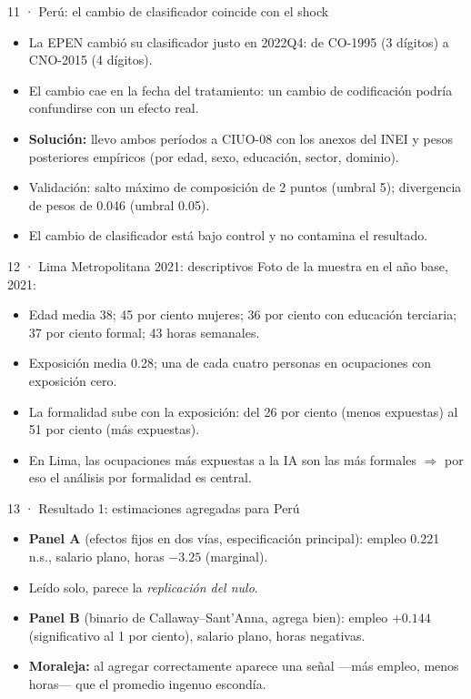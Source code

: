 \documentclass[11pt,aspectratio=169]{beamer}
\begin{document}
\begin{frame}{11 · Perú: el cambio de clasificador coincide con el shock}
\begin{itemize}
  \item La EPEN cambió su clasificador justo en 2022Q4: de CO-1995 (3 dígitos) a CNO-2015 (4 dígitos).
  \item El cambio cae en la fecha del tratamiento: un cambio de codificación podría confundirse con un efecto real.
  \item \textbf{Solución:} llevo ambos períodos a CIUO-08 con los anexos del INEI y pesos posteriores empíricos (por edad, sexo, educación, sector, dominio).
  \item Validación: salto máximo de composición de 2 puntos (umbral 5); divergencia de pesos de 0.046 (umbral 0.05).
  \item El cambio de clasificador está bajo control y no contamina el resultado.
\end{itemize}
\end{frame}

\begin{frame}{12 · Lima Metropolitana 2021: descriptivos}
Foto de la muestra en el año base, 2021:
\begin{itemize}
  \item Edad media 38; 45 por ciento mujeres; 36 por ciento con educación terciaria; 37 por ciento formal; 43 horas semanales.
  \item Exposición media 0.28; una de cada cuatro personas en ocupaciones con exposición cero.
  \item La formalidad sube con la exposición: del 26 por ciento (menos expuestas) al 51 por ciento (más expuestas).
  \item En Lima, las ocupaciones más expuestas a la IA son las más formales $\Rightarrow$ por eso el análisis por formalidad es central.
\end{itemize}
\end{frame}

\begin{frame}{13 · Resultado 1: estimaciones agregadas para Perú}
\begin{itemize}
  \item \textbf{Panel A} (efectos fijos en dos vías, especificación principal): empleo 0.221 n.s., salario plano, horas $-3.25$ (marginal).
  \item Leído solo, parece la \emph{replicación del nulo}.
  \item \textbf{Panel B} (binario de Callaway--Sant'Anna, agrega bien): empleo $+0.144$ (significativo al 1 por ciento), salario plano, horas negativas.
  \item \textbf{Moraleja:} al agregar correctamente aparece una señal —más empleo, menos horas— que el promedio ingenuo escondía.
\end{itemize}
\end{frame}
\end{document}
